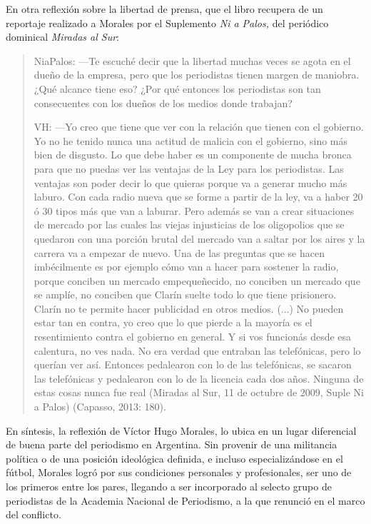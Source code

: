 En otra reflexión sobre la libertad de prensa, que el libro recupera de un reportaje realizado a Morales por el Suplemento \emph{Ni a Palos,} del periódico dominical \emph{Miradas al Sur}:

\begin{quote}
NiaPalos: ---Te escuché decir que la libertad muchas veces se agota en el dueño de la empresa, pero que los periodistas tienen margen de maniobra. ¿Qué alcance tiene eso? ¿Por qué entonces los periodistas son tan consecuentes con los dueños de los medios donde trabajan?

VH: ---Yo creo que tiene que ver con la relación que tienen con el gobierno. Yo no he tenido nunca una actitud de malicia con el gobierno, sino más bien de disgusto. Lo que debe haber es un componente de mucha bronca para que no puedas ver las ventajas de la Ley para los periodistas. Las ventajas son poder decir lo que quieras porque va a generar mucho más laburo. Con cada radio nueva que se forme a partir de la ley, va a haber 20 ó 30 tipos más que van a laburar. Pero además se van a crear situaciones de mercado por las cuales las viejas injusticias de los oligopolios que se quedaron con una porción brutal del mercado van a saltar por los aires y la carrera va a empezar de nuevo. Una de las preguntas que se hacen imbécilmente es por ejemplo cómo van a hacer para sostener la radio, porque conciben un mercado empequeñecido, no conciben un mercado que se amplíe, no conciben que Clarín suelte todo lo que tiene prisionero. Clarín no te permite hacer publicidad en otros medios. (...) No pueden estar tan en contra, yo creo que lo que pierde a la mayoría es el resentimiento contra el gobierno en general. Y si vos funcionás desde esa calentura, no ves nada. No era verdad que entraban las telefónicas, pero lo querían ver así. Entonces pedalearon con lo de las telefónicas, se sacaron las telefónicas y pedalearon con lo de la licencia cada dos años. Ninguna de estas cosas nunca fue real (Miradas al Sur, 11 de octubre de 2009, Suple Ni a Palos) (Capasso, 2013: 180).
\end{quote}

En síntesis, la reflexión de Víctor Hugo Morales, lo ubica en un lugar diferencial de buena parte del periodismo en Argentina. Sin provenir de una militancia política o de una posición ideológica definida, e incluso especializándose en el fútbol, Morales logró por sus condiciones personales y profesionales, ser uno de los primeros entre los pares, llegando a ser incorporado al selecto grupo de periodistas de la Academia Nacional de Periodismo, a la que renunció en el marco del conflicto.

